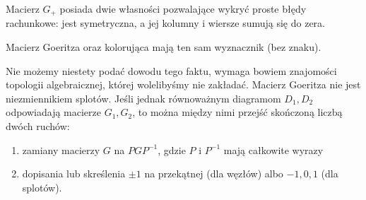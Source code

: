 Macierz $G_+$ posiada dwie własności pozwalające wykryć proste błędy rachunkowe: jest symetryczna, a jej kolumny i wiersze sumują się do zera.

\begin{proposition}
    Macierz Goeritza oraz kolorująca mają ten sam wyznacznik (bez znaku).
\end{proposition}

Nie możemy niestety podać dowodu tego faktu, wymaga bowiem znajomości topologii algebraicznej, której wolelibyśmy nie zakładać.
Macierz Goeritza nie jest niezmiennikiem splotów.
Jeśli jednak równoważnym diagramom $D_1, D_2$ odpowiadają macierze $G_1, G_2$, to można między nimi przejść skończoną liczbą dwóch ruchów:
\begin{enumerate}[leftmargin=*]
\itemsep0em
    \item zamiany macierzy $G$ na $PGP^{-1}$, gdzie $P$ i $P^{-1}$ mają całkowite wyrazy
    \item dopisania lub skreślenia $\pm 1$ na przekątnej (dla węzłów) albo $-1, 0, 1$ (dla splotów).
\end{enumerate}




